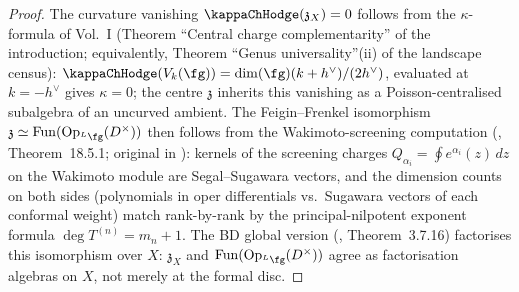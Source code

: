 \begin{proof}
The curvature vanishing $\kappaChHodge(\mathfrak{z}_X)=0$ follows from the
$\kappa$-formula of Vol.~I \textup{(}Theorem ``Central charge
complementarity'' of the introduction; equivalently, Theorem
``Genus universality''(ii) of the landscape census\textup{)}:
$\kappaChHodge(V_k(\fg)) = \dim(\fg)(k+h^\vee)/(2h^\vee)$, evaluated at
$k = -h^\vee$ gives $\kappa = 0$; the centre $\mathfrak{z}$ inherits
this vanishing as a Poisson-centralised subalgebra of an uncurved
ambient. The Feigin--Frenkel isomorphism $\mathfrak{z} \simeq
\mathrm{Fun}(\mathrm{Op}_{{}^L\fg}(D^\times))$ then follows from the
Wakimoto-screening computation (\cite{FBZ04}, Theorem~18.5.1;
original in \cite{FF90}): kernels of the screening charges
$Q_{\alpha_i} = \oint e^{\alpha_i}(z)\,dz$ on the Wakimoto module
are Segal--Sugawara vectors, and the dimension counts on both sides
(polynomials in oper differentials vs.\ Sugawara vectors of each
conformal weight) match rank-by-rank by the principal-nilpotent
exponent formula $\deg T^{(n)} = m_n + 1$. The BD global version
(\cite{BD04}, Theorem~3.7.16) factorises this isomorphism over $X$:
$\mathfrak{z}_X$ and $\mathrm{Fun}(\mathrm{Op}_{{}^L\fg}(D^\times))$
agree as factorisation algebras on $X$, not merely at the formal
disc.


\end{proof}
